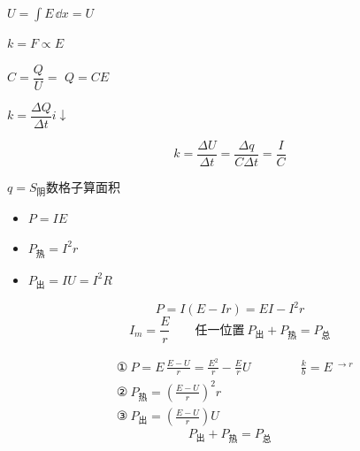 
$U=\displaystyle\int E\,\dd x=U$ %

$k=F\propto E$ %



$C=\dfrac{Q}{U}=$ \qquad $Q=CE$

$k=\dfrac{\Delta Q}{\Delta t}$\qquad $i\downarrow$


\[
k=\frac{\Delta U}{\Delta t}=\frac{\Delta q}{C\Delta t}=\frac{I}{C}
\]


$q=S_{\text{阴}}$\qquad 数格子算面积 %
\begin{itemize}
\item $P=IE$
\item $P_{\text{热}}=I^2r$
\item $P_{\text{出}}=IU=I^2R$
\end{itemize}


\[
P=I(E-Ir)=EI-I^2r
\]
\[
I_m=\frac{E}{r}\qquad\text{任一位置}\ P_{\text{出}}+P_{\text{热}}=P_{\text{总}}
\]


\begin{align*}
&\text{①}\ P=E\,\frac{E-U}{r}=\frac{E^2}{r}-\frac{E}{r}U\qquad\qquad \frac{k}{b}=E\ {}^{\to r}\\
&\text{②}\ P_{\text{热}}=\left(\frac{E-U}{r}\right)^{2}r\\
&\text{③}\ P_{\text{出}}=\left(\frac{E-U}{r}\right)U
\end{align*}
\[
P_{\text{出}}+P_{\text{热}}=P_{\text{总}}
\]
